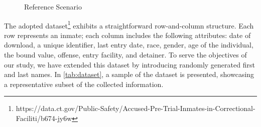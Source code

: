 \begin{figure}[ht!]
  \caption{Reference Scenario}
  \label{fig:reference_scenario}
\end{figure}

The adopted dataset\footnote{https://data.ct.gov/Public-Safety/Accused-Pre-Trial-Inmates-in-Correctional-Faciliti/b674-jy6w} exhibits a straightforward row-and-column structure.
Each row represents an inmate; each column includes the following attributes: date of download, a unique identifier, last entry date, race, gender, age of the individual, the bound value, offense, entry facility, and detainer.
To serve the objectives of our study, we have extended this dataset by introducing randomly generated first and last names.
In \cref{tab:dataset}, a sample of the dataset is presented, showcasing a representative subset of the collected information.


